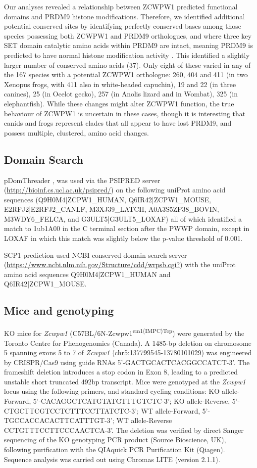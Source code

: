 Our analyses revealed a relationship between ZCWPW1 predicted functional domains and PRDM9 histone modifications.
Therefore, we identified additional potential conserved sites by identifying perfectly conserved bases among those species possessing both ZCWPW1 and PRDM9 orthologues, and where three key SET domain catalytic amino acids within PRDM9 are intact, meaning PRDM9 is predicted to have normal histone modification activity \parencite{Baker2017Repeated}.
This identified a slightly larger number of conserved amino acids (37).
Only eight of these varied in any of the 167 species with a potential ZCWPW1 orthologue: 260, 404 and 411 (in two Xenopus frogs, with 411 also in white-headed capuchin), 19 and 22 (in three canines), 25 (in Ocelot gecko), 257 (in Anolis lizard and in Wombat), 325 (in elephantfish).
While these changes might alter ZCWPW1 function, the true behaviour of ZCWPW1 is uncertain in these cases, though it is interesting that canids and frogs represent clades that all appear to have lost PRDM9, and possess multiple, clustered, amino acid changes.

\subsection{Domain Search}
\label{sec:threading}
pDomThreader \parencite{Lobley2009pGenTHREADER}, was used via the PSIPRED server (\url{http://bioinf.cs.ucl.ac.uk/psipred/}) on the following uniProt amino acid sequences (Q9H0M4|ZCPW1\_HUMAN, Q6IR42|ZCPW1\_MOUSE, E2RFJ2|E2RFJ2\_CANLF, M3XJ39\_LATCH, A0A3S5ZP38\_BOVIN, M3WDY6\_FELCA, and G3ULT5|G3ULT5\_LOXAF) all of which identified a match to 1ub1A00 in the C terminal section after the PWWP domain, except in LOXAF in which this match was slightly below the p-value threshold of 0.001.

SCP1 prediction used NCBI conserved domain search server (\url{https://www.ncbi.nlm.nih.gov/Structure/cdd/wrpsb.cgi?}) with the uniProt amino acid sequences Q9H0M4|ZCPW1\_HUMAN and Q6IR42|ZCPW1\_MOUSE.

\subsection{Mice and genotyping}
\label{sec:komice}
KO mice for \textit{Zcwpw1} (C57BL/6N-Zcwpw1\textsuperscript{em1(IMPC)Tcp}) were generated by the Toronto Centre for Phenogenomics (Canada).
A 1485-bp deletion on chromosome 5 spanning exons 5 to 7 of \textit{Zcwpw1} (chr5:137799545-13780101029) was engineered by CRISPR/Cas9 using guide RNAs 5’-GACTGCACTCACGGCCATCT-3’.
The frameshift deletion introduces a stop codon in Exon 8, leading to a predicted unstable short truncated 492bp transcript.
Mice were genotyped at the \textit{Zcwpw1} locus using the following primers, and standard cycling conditions: KO allele-Forward, 5’-CACAGGCTCATGTATGTTTGTCTC-3’; KO allele-Reverse, 5’-CTGCTTCGTCCTCTTTCCTTATCTC-3’; WT allele-Forward, 5’-TGCCACCACACTTCATTTGT-3’; WT allele-Reverse CCTGTTTCCTTCCCAACTCA-3’.
The deletion was verified by direct Sanger sequencing of the KO genotyping PCR product (Source Bioscience, UK), following purification with the QIAquick PCR Purification Kit (Qiagen).
Sequence analysis was carried out using Chromas LITE (version 2.1.1).


